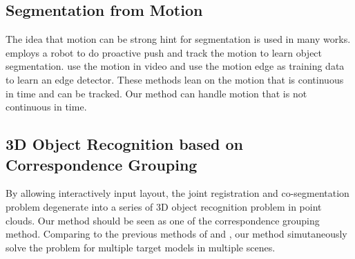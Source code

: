 \subsection{Segmentation from Motion}
The idea that motion can be strong hint for segmentation is used in many works.\cite{Xu:2015:ACS:2816795.2818075} employs a robot to do proactive push and track the motion to learn object segmentation. \cite{unsupervisededge} use the motion in video and use the motion edge as training data to learn an edge detector. These methods lean on the motion that is continuous in time and can be tracked. Our method can handle motion that is not continuous in time.

\subsection{3D Object Recognition based on Correspondence Grouping}
By allowing interactively input layout, the joint registration and co-segmentation problem degenerate into a series of 3D object recognition problem in point clouds. Our method should be seen as one of the correspondence grouping method. Comparing to the previous methods of \cite{hough} and \cite{LOF}, our method simutaneously solve the problem for multiple target models in multiple scenes.